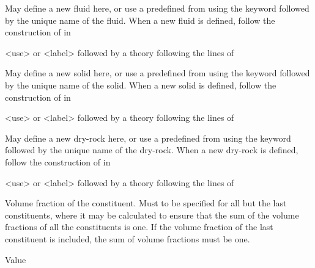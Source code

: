{
 \slist
   \item \Description May define a new fluid here, or use a predefined  from  using the keyword  followed by the unique name of the fluid. When a new fluid is defined, follow the construction of  in 
   \item \Argument <use> or <label> followed by a theory following the lines of 
   \item \Default
 \elist

 \slist
   \item \Description May define a new solid here, or use a predefined  from  using the keyword  followed by the unique name of the solid. When a new solid is defined, follow the construction of  in 
   \item \Argument <use> or <label> followed by a theory following the lines of 
   \item \Default
 \elist

 \slist
   \item \Description  May define a new dry-rock here, or use a predefined  from  using the keyword  followed by the unique name of the dry-rock. When a new dry-rock is defined, follow the construction of  in 
   \item \Argument <use> or <label> followed by a theory following the lines of 
   \item \Default
 \elist

 \slist
   \item \Description Volume fraction of the constituent. Must to be specified for all but the last constituents, where it may be calculated to ensure that the sum of the volume fractions of all the constituents is one. If the volume fraction of the last constituent is included, the sum of volume fractions must be one.
   \item \Argument Value
   \item \Default
 \elist

}
